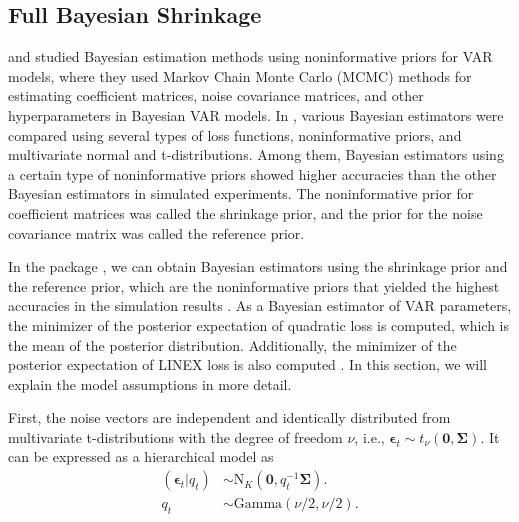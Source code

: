 \documentclass[
]{jss}
\begin{document}
\hypertarget{full-bayesian-shrinkage}{%
\subsection{Full Bayesian Shrinkage}\label{full-bayesian-shrinkage}}

\citet{Ni05} and \citet{Sun04} studied Bayesian estimation methods using
noninformative priors for VAR models, where they used Markov Chain Monte
Carlo (MCMC) methods for estimating coefficient matrices, noise
covariance matrices, and other hyperparameters in Bayesian VAR models.
In \citet{Ni05}, various Bayesian estimators were compared using several
types of loss functions, noninformative priors, and multivariate normal
and t-distributions. Among them, Bayesian estimators using a certain
type of noninformative priors showed higher accuracies than the other
Bayesian estimators in simulated experiments. The noninformative prior
for coefficient matrices was called the shrinkage prior, and the prior
for the noise covariance matrix was called the reference prior.

In the package , we can obtain Bayesian estimators using
the shrinkage prior and the reference prior, which are the
noninformative priors that yielded the highest accuracies in the
simulation results \citep{Ni05}. As a Bayesian estimator of VAR
parameters, the minimizer of the posterior expectation of quadratic loss
is computed, which is the mean of the posterior distribution.
Additionally, the minimizer of the posterior expectation of LINEX loss
is also computed \citep{Ni05, Zellner86}. In this section, we will
explain the model assumptions in more detail.

First, the noise vectors are independent and identically distributed
from multivariate t-distributions with the degree of freedom \(\nu\),
i.e.,
\(\boldsymbol\epsilon_t \sim t_\nu (\mathbf{0}, \mathbf{\Sigma})\). It
can be expressed as a hierarchical model as \begin{equation}
    \label{noise_tdist_hierarchy}
    \begin{split}
    ( \boldsymbol\epsilon_t | q_t )    & \sim \text{N}_K (\mathbf{0}, q_t^{-1} \mathbf{\Sigma}).
    \\
    q_t     & \sim \text{Gamma}(\nu/2, \nu/2).
    \end{split}
    \end{equation}
\end{document}
